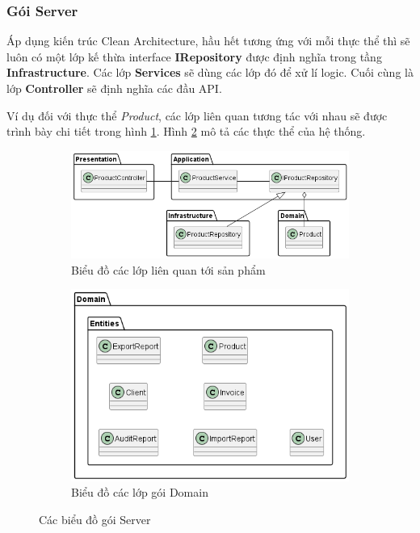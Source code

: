 \documentclass[../DoAn.tex]{subfiles}
\begin{document}
\subsubsection{Gói Server}
\label{subsubsection:systemdesign-package-server}
Áp dụng kiến trúc Clean Architecture, hầu hết tương ứng với mỗi thực thể thì sẽ luôn có một lớp kế thừa interface \textbf{IRepository} được định nghĩa trong tầng \textbf{Infrastructure}. Các lớp \textbf{Services} sẽ dùng các lớp đó để xử lí logic. Cuối cùng là lớp \textbf{Controller} sẽ định nghĩa các đầu API.

Ví dụ đối với thực thể \textit{Product}, các lớp liên quan tương tác với nhau sẽ được trình bày chi tiết trong hình \ref{fig:package-server-product}. Hình \ref{fig:package-server-domain} mô tả các thực thể của hệ thống.
\begin{figure}[H]
    \begin{subfigure}{0.59\textwidth}
        \centering
        \includegraphics[width=1\linewidth]{Hinhve/design/package/server/Product}
        \caption{Biểu đồ các lớp liên quan tới sản phẩm}
        \label{fig:package-server-product}
    \end{subfigure}
    \begin{subfigure}{0.4\textwidth}
        \centering
        \includegraphics[width=1\linewidth]{Hinhve/design/package/server/Domain}
        \caption{Biểu đồ các lớp gói Domain}
        \label{fig:package-server-domain}
    \end{subfigure}
    \caption{Các biểu đồ gói Server}
    \label{fig:package-server}
\end{figure}
\end{document}
